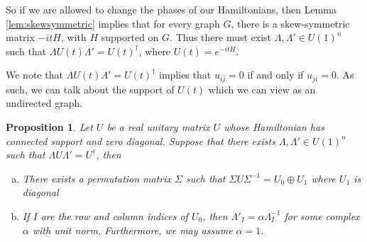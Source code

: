 \documentclass[twocolumn,superscriptaddress]{revtex4-1}
\theoremstyle{plain}
\newtheorem{proposition}[theorem]{Proposition}
\theoremstyle{definition}
\theoremstyle{definition}
\theoremstyle{definition}
\theoremstyle{definition}
\theoremstyle{definition}
\theoremstyle{definition}
\begin{document}
So if we are allowed to change the phases of our Hamiltonians, then Lemma \ref{lem:skewsymmetric} implies that for every graph $G$, there is a skew-symmetric matrix $-itH$, with $H$ supported on $G$. Thus there must exist $\Lambda,\Lambda'\in U(1)^n$ such that $\Lambda U(t)\Lambda'=U(t)^\dagger$, where $U(t)=e^{-itH}$.

 We note that $\Lambda U(t)\Lambda'=U(t)^\dagger$ implies that $u_{ij}=0$ if and only if $u_{ji}=0$. As such, we can talk about the support of $U(t)$ which we can view as an undirected graph.

\begin{proposition}\label{prop:decomp}
 Let $U$ be a real unitary matrix $U$ whose Hamiltonian has connected support and zero diagonal. Suppose that there exists $\Lambda,\Lambda'\in U(1)^n$ such that $\Lambda U\Lambda'=U^\dagger$, then
 \begin{enumerate}[(a)]
  \item There exists a permutation matrix $\Sigma$ such that $\Sigma U\Sigma^{-1}=U_0\oplus U_1$ where $U_1$ is diagonal
  \item If $I$ are the row and column indices of $U_0$, then $\Lambda'_I=\alpha \Lambda_I^{-1}$ for some complex $\alpha$ with unit norm. Furthermore, we may assume $\alpha=1$.
 \end{enumerate}
\end{proposition}
\end{document}
